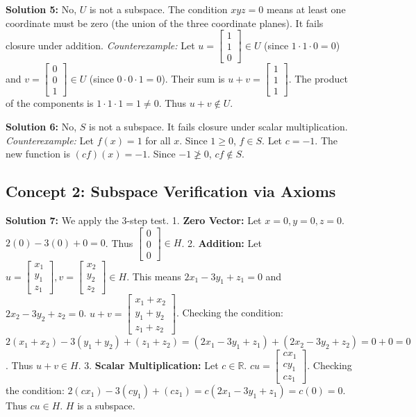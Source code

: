 \documentclass[11pt]{article}
\begin{document}
\vspace{0.3cm}
\textbf{Solution 5:}
No, $U$ is not a subspace. The condition $xyz=0$ means at least one coordinate must be zero (the union of the three coordinate planes). It fails closure under addition.
\textit{Counterexample:} Let $u = \begin{bmatrix} 1 \\ 1 \\ 0 \end{bmatrix} \in U$ (since $1\cdot 1\cdot 0 = 0$) and $v = \begin{bmatrix} 0 \\ 0 \\ 1 \end{bmatrix} \in U$ (since $0\cdot 0\cdot 1 = 0$). Their sum is $u+v = \begin{bmatrix} 1 \\ 1 \\ 1 \end{bmatrix}$. The product of the components is $1\cdot 1\cdot 1 = 1 \neq 0$. Thus $u+v \notin U$.

\vspace{0.3cm}
\textbf{Solution 6:}
No, $S$ is not a subspace. It fails closure under scalar multiplication.
\textit{Counterexample:} Let $f(x) = 1$ for all $x$. Since $1 \ge 0$, $f \in S$. Let $c = -1$. The new function is $(cf)(x) = -1$. Since $-1 \not\ge 0$, $cf \notin S$.

\subsection*{Concept 2: Subspace Verification via Axioms}

\textbf{Solution 7:}
We apply the 3-step test.
1. \textbf{Zero Vector:} Let $x=0, y=0, z=0$. $2(0) - 3(0) + 0 = 0$. Thus $\begin{bmatrix} 0 \\ 0 \\ 0 \end{bmatrix} \in H$.
2. \textbf{Addition:} Let $u = \begin{bmatrix} x_1 \\ y_1 \\ z_1 \end{bmatrix}, v = \begin{bmatrix} x_2 \\ y_2 \\ z_2 \end{bmatrix} \in H$. This means $2x_1 - 3y_1 + z_1 = 0$ and $2x_2 - 3y_2 + z_2 = 0$.
$u+v = \begin{bmatrix} x_1+x_2 \\ y_1+y_2 \\ z_1+z_2 \end{bmatrix}$. Checking the condition: $2(x_1+x_2) - 3(y_1+y_2) + (z_1+z_2) = (2x_1 - 3y_1 + z_1) + (2x_2 - 3y_2 + z_2) = 0 + 0 = 0$. Thus $u+v \in H$.
3. \textbf{Scalar Multiplication:} Let $c \in \mathbb{R}$. $cu = \begin{bmatrix} cx_1 \\ cy_1 \\ cz_1 \end{bmatrix}$. Checking the condition: $2(cx_1) - 3(cy_1) + (cz_1) = c(2x_1 - 3y_1 + z_1) = c(0) = 0$. Thus $cu \in H$. $H$ is a subspace.
\end{document}
